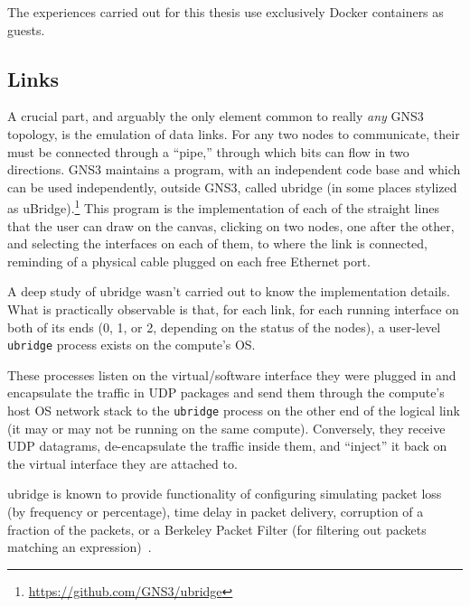 The experiences carried out for this thesis use exclusively Docker containers as guests.

\subsection{Links}
\label{subsec:links}

A crucial part, and arguably the only element common to really \emph{any} GNS3 topology, is the emulation of data links.
For any two nodes to communicate, their  must be connected through a ``pipe,'' through which bits can flow in two directions.
GNS3 maintains a program, with an independent code base and which can be used independently, outside GNS3, called ubridge (in some places stylized as uBridge).\footnote{\url{https://github.com/GNS3/ubridge}}
This program is the implementation of each of the straight lines that the user can draw on the canvas, clicking on two nodes, one after the other, and selecting the interfaces on each of them, to where the link is connected, reminding of a physical cable plugged on each free Ethernet port.

A deep study of ubridge wasn't carried out to know the implementation details.
What is practically observable is that, for each link, for each running interface on both of its ends (0, 1, or 2, depending on the status of the nodes), a user-level \texttt{ubridge} process exists on the compute's OS.

These processes listen on the virtual/software interface they were plugged in and encapsulate the traffic in UDP packages and send them through the compute's host OS network stack to the \texttt{ubridge} process on the other end of the logical link (it may or may not be running on the same compute). %
Conversely, they receive UDP datagrams, de-encapsulate the traffic inside them, and ``inject'' it back on the virtual interface they are attached to.


ubridge is known to provide functionality of configuring simulating packet loss (by frequency or percentage), time delay in packet delivery, corruption of a fraction of the packets, or a Berkeley Packet Filter (for filtering out packets matching an expression)~\cite{ubridgereadme}.

